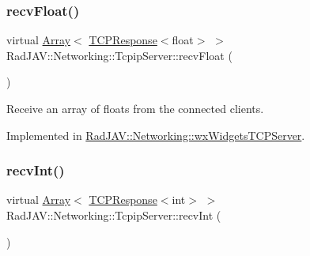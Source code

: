 \mbox{\label{class_rad_j_a_v_1_1_networking_1_1_tcpip_server_ac4c82b498b48e5f4731063c335c28d74}} 
\subsubsection{\texorpdfstring{recv\+Float()}{recvFloat()}}
{\footnotesize\ttfamily virtual \mbox{\hyperlink{class_rad_j_a_v_1_1_array}{Array}}$<$ \mbox{\hyperlink{class_rad_j_a_v_1_1_networking_1_1_t_c_p_response}{T\+C\+P\+Response}}$<$float$>$ $>$ Rad\+J\+A\+V\+::\+Networking\+::\+Tcpip\+Server\+::recv\+Float (\begin{DoxyParamCaption}{ }\end{DoxyParamCaption})\hspace{0.3cm}{\ttfamily [pure virtual]}}



Receive an array of floats from the connected clients. 



Implemented in \mbox{\hyperlink{class_rad_j_a_v_1_1_networking_1_1wx_widgets_t_c_p_server_a6d166a7063da355d649fe8b1f75f44c9}{Rad\+J\+A\+V\+::\+Networking\+::wx\+Widgets\+T\+C\+P\+Server}}.

\mbox{\label{class_rad_j_a_v_1_1_networking_1_1_tcpip_server_a7d84d5c0a2a8ca211b2a12c9154a7b6f}} 
\subsubsection{\texorpdfstring{recv\+Int()}{recvInt()}}
{\footnotesize\ttfamily virtual \mbox{\hyperlink{class_rad_j_a_v_1_1_array}{Array}}$<$ \mbox{\hyperlink{class_rad_j_a_v_1_1_networking_1_1_t_c_p_response}{T\+C\+P\+Response}}$<$int$>$ $>$ Rad\+J\+A\+V\+::\+Networking\+::\+Tcpip\+Server\+::recv\+Int (\begin{DoxyParamCaption}{ }\end{DoxyParamCaption})\hspace{0.3cm}{\ttfamily [pure virtual]}}



